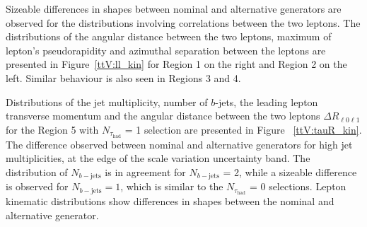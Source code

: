 Sizeable differences in shapes between nominal and alternative generators are observed for the distributions involving correlations between the two leptons.
The distributions of the angular distance between the two leptons, maximum of lepton's pseudorapidity and azimuthal separation between the leptons are presented in Figure~\ref{ttV:ll_kin} for Region 1 on the right and Region 2 on the left. 
Similar behaviour is also seen in Regions 3 and 4.

Distributions of the jet multiplicity, number of $b$-jets, the leading lepton transverse momentum and the angular distance between the two leptons  $\Delta R _{\ell 0\ell1 }$ for the Region 5 with $N_{\tau_\mathrm{had}}$ = 1 selection are presented in Figure ~\ref{ttV:tauR_kin}.
The difference observed between nominal and alternative generators for high jet multiplicities, at the edge of the scale variation uncertainty band. 
The distribution of $N_{b-\mathrm{jets}}$ is in agreement for $N_{b-\mathrm{jets}}$ = 2, while a sizeable difference is observed for $N_{b-\mathrm{jets}} = 1$, which is similar to the $N_{\tau_\mathrm{had}}$ = 0 selections. 
Lepton kinematic distributions show differences in shapes between the nominal and alternative generator.

